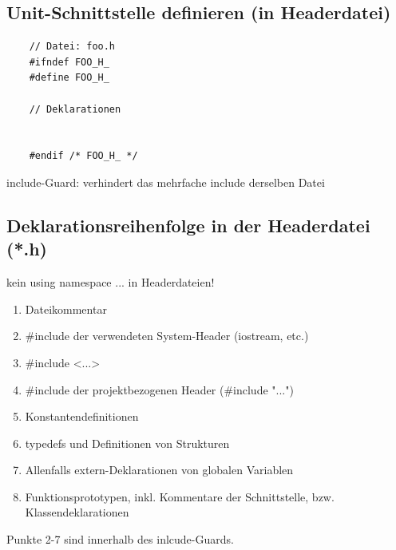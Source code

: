 \subsection{Unit-Schnittstelle definieren (in Headerdatei)}
\label{sec:Unit-Schnittstelle definieren}
\noindent
\begin{minipage}{\linewidth}
	\begin{lstlisting}
	// Datei: foo.h
	#ifndef FOO_H_
	#define FOO_H_
	
	// Deklarationen
	
	
	#endif /* FOO_H_ */
	\end{lstlisting}
\end{minipage}
\begin{hinweis}
include-Guard: verhindert das mehrfache include derselben Datei
\end{hinweis}

\subsection{Deklarationsreihenfolge in der Headerdatei (*.h)}
\label{sec:Deklarationsreihenfolge in der Headerdatei}
\begin{achtung}
	kein using namespace ... in Headerdateien!
\end{achtung}
\begin{enumerate}
	\item Dateikommentar
	\item \#include der verwendeten System-Header (iostream, etc.)
	\item[\-] \#include <...>
	\item \#include der projektbezogenen Header (\#include "...")
	\item Konstantendefinitionen
	\item typedefs und Definitionen von Strukturen
	\item Allenfalls extern-Deklarationen von globalen Variablen
	\item Funktionsprototypen, inkl. Kommentare der Schnittstelle, bzw. Klassendeklarationen
\end{enumerate}
\begin{hinweis}
	Punkte 2-7 sind innerhalb des inlcude-Guards.
\end{hinweis}

